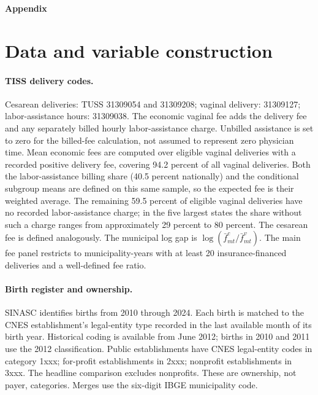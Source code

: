 
\clearpage
{}
{}
\begin{center}{\Large\bfseries Appendix}\end{center}
\vspace{0.5em}


\section{Data and variable construction}\label{app:data}
\paragraph{TISS delivery codes.} Cesarean deliveries: TUSS 31309054 and 31309208; vaginal delivery: 31309127; labor-assistance hours: 31309038. The economic vaginal fee adds the delivery fee and any separately billed hourly labor-assistance charge. Unbilled assistance is set to zero for the billed-fee calculation, not assumed to represent zero physician time. Mean economic fees are computed over eligible vaginal deliveries with a recorded positive delivery fee, covering 94.2 percent of all vaginal deliveries. Both the labor-assistance billing share (40.5 percent nationally) and the conditional subgroup means are defined on this same sample, so the expected fee is their weighted average. The remaining 59.5 percent of eligible vaginal deliveries have no recorded labor-assistance charge; in the five largest states the share without such a charge ranges from approximately 29 percent to 80 percent. The cesarean fee is defined analogously. The municipal log gap is $\log(\bar f^c_{mt}/\bar f^v_{mt})$. The main fee panel restricts to municipality-years with at least 20 insurance-financed deliveries and a well-defined fee ratio.

\paragraph{Birth register and ownership.} SINASC identifies births from 2010 through 2024. Each birth is matched to the CNES establishment's legal-entity type recorded in the last available month of its birth year. Historical coding is available from June 2012; births in 2010 and 2011 use the 2012 classification. Public establishments have CNES legal-entity codes in category 1xxx; for-profit establishments in 2xxx; nonprofit establishments in 3xxx. The headline comparison excludes nonprofits. These are ownership, not payer, categories. Merges use the six-digit IBGE municipality code.

